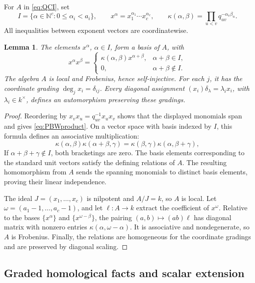 \documentclass[11pt,a4paper]{article}
\numberwithin{equation}{section}
\theoremstyle{definition}
\theoremstyle{plain}
\newtheorem{lemma}[definition]{Lemma}
\theoremstyle{remark}
\newcommand{\N}{\mathbb N}
\begin{document}
For \(A\) in \eqref{eq:QCI}, set
\[
 I=\{\alpha\in\N^c:0\leq\alpha_i<a_i\},\qquad
 x^\alpha=x_1^{\alpha_1}\cdots x_c^{\alpha_c},\qquad
 \kappa(\alpha,\beta)=\prod_{u<v}q_{uv}^{-\alpha_v\beta_u}.
\]
All inequalities between exponent vectors are coordinatewise.

\begin{lemma}\label{lem:structure}
The elements \(x^\alpha\), \(\alpha\in I\), form a basis of \(A\), with
\begin{equation}\label{eq:PBWproduct}
 x^\alpha x^\beta=
 \begin{cases}
 \kappa(\alpha,\beta)x^{\alpha+\beta},&\alpha+\beta\in I,\\
 0,&\alpha+\beta\notin I.
 \end{cases}
\end{equation}
The algebra \(A\) is local and Frobenius, hence self-injective.
For each \(j\), it has the coordinate grading
\(\deg_jx_i=\delta_{ij}\). Every diagonal assignment
\((x_i)\delta_\lambda=\lambda_i x_i\), with \(\lambda_i\in k^\times\),
defines an automorphism preserving these gradings.
\end{lemma}

\begin{proof}
Reordering by \(x_vx_u=q_{uv}^{-1}x_ux_v\) shows that the displayed
monomials span and gives \eqref{eq:PBWproduct}. On a vector space with
basis indexed by \(I\), this formula defines an associative multiplication:
\[
 \kappa(\alpha,\beta)\kappa(\alpha+\beta,\gamma)
 =\kappa(\beta,\gamma)\kappa(\alpha,\beta+\gamma),
\]
If \(\alpha+\beta+\gamma\notin I\), both bracketings are zero.
The basis elements corresponding to the standard unit vectors
satisfy the defining relations of \(A\).
The resulting homomorphism from \(A\) sends the spanning monomials
to distinct basis elements, proving their linear independence.

The ideal \(J=(x_1,\ldots,x_c)\) is nilpotent and \(A/J=k\), so \(A\)
is local. Let \(\omega=(a_1-1,\ldots,a_c-1)\), and let \(\ell:A\to k\)
extract the coefficient of \(x^\omega\). Relative to the bases
\(\{x^\alpha\}\) and \(\{x^{\omega-\beta}\}\), the pairing
\((a,b)\mapsto(ab)\ell\) has diagonal matrix with nonzero entries
\(\kappa(\alpha,\omega-\alpha)\). It is associative and nondegenerate,
so \(A\) is Frobenius. Finally, the relations are homogeneous for the
coordinate gradings and are preserved by diagonal scaling.
\end{proof}

\subsection{Graded homological facts and scalar extension}
\end{document}

